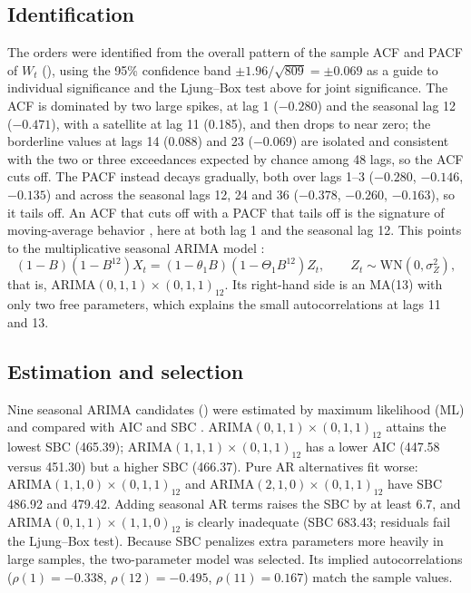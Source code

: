 \documentclass[11pt,letterpaper]{article}
\begin{document}
\subsection{Identification}
The orders were identified from the overall pattern of the sample ACF and PACF of $W_t$ (), using the 95\% confidence band $\pm1.96/\sqrt{809}=\pm0.069$ as a guide to individual significance and the Ljung--Box test above for joint significance. The ACF is dominated by two large spikes, at lag 1 ($-0.280$) and the seasonal lag 12 ($-0.471$), with a satellite at lag 11 (0.185), and then drops to near zero; the borderline values at lags 14 (0.088) and 23 ($-0.069$) are isolated and consistent with the two or three exceedances expected by chance among 48 lags, so the ACF cuts off. The PACF instead decays gradually, both over lags 1--3 ($-0.280$, $-0.146$, $-0.135$) and across the seasonal lags 12, 24 and 36 ($-0.378$, $-0.260$, $-0.163$), so it tails off. An ACF that cuts off with a PACF that tails off is the signature of moving-average behavior \citep{brockwell2016}, here at both lag 1 and the seasonal lag 12. This points to the multiplicative seasonal ARIMA model \citep{box2015}:
\begin{equation}
(1-B)(1-B^{12})X_t = (1-\theta_1 B)(1-\Theta_1 B^{12})Z_t, \qquad Z_t \sim \mathrm{WN}(0,\sigma_Z^2),
\end{equation}
that is, ARIMA$(0,1,1)\times(0,1,1)_{12}$. Its right-hand side is an MA(13) with only two free parameters, which explains the small autocorrelations at lags 11 and 13.

\subsection{Estimation and selection}
Nine seasonal ARIMA candidates () were estimated by maximum likelihood (ML) and compared with AIC and SBC \citep{schwarz1978}. ARIMA$(0,1,1)\times(0,1,1)_{12}$ attains the lowest SBC (465.39); ARIMA$(1,1,1)\times(0,1,1)_{12}$ has a lower AIC (447.58 versus 451.30) but a higher SBC (466.37). Pure AR alternatives fit worse: ARIMA$(1,1,0)\times(0,1,1)_{12}$ and ARIMA$(2,1,0)\times(0,1,1)_{12}$ have SBC 486.92 and 479.42. Adding seasonal AR terms raises the SBC by at least 6.7, and ARIMA$(0,1,1)\times(1,1,0)_{12}$ is clearly inadequate (SBC 683.43; residuals fail the Ljung--Box test). Because SBC penalizes extra parameters more heavily in large samples, the two-parameter model was selected. Its implied autocorrelations ($\rho(1)=-0.338$, $\rho(12)=-0.495$, $\rho(11)=0.167$) match the sample values.
\end{document}

